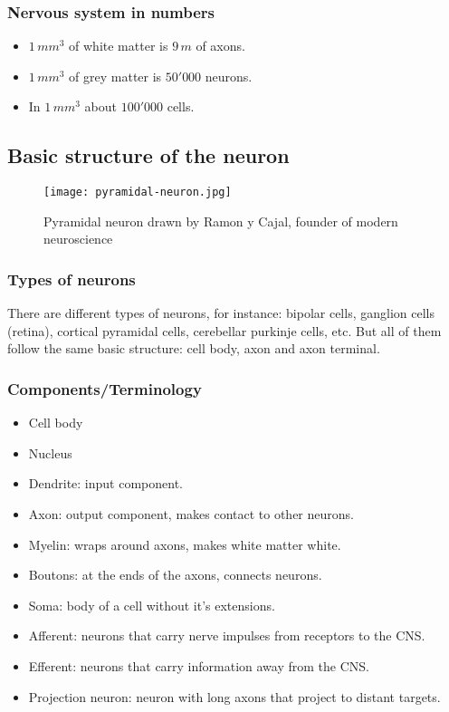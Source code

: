\documentclass[main]{subfiles}
\begin{document}
\subsubsection{Nervous system in numbers}
\begin{itemize}[noitemsep,nolistsep]
	\item $1\,mm^3$ of white matter is $9\,m$ of axons.
	\item $1\,mm^3$ of grey matter is $50'000$ neurons.
	\item In $1\,mm^3$ about $100'000$ cells.
\end{itemize}

\subsection{Basic structure of the neuron}

\begin{figure}[H]
	\centering
	\texttt{[image: pyramidal-neuron.jpg]}
	\caption{Pyramidal neuron drawn by Ramon y Cajal, founder of modern neuroscience}
\end{figure}

\subsubsection{Types of neurons}
There are different types of neurons, for instance: bipolar cells, ganglion cells (retina), cortical pyramidal cells, cerebellar purkinje cells, etc. But all of them follow the same basic structure: cell body, axon and axon terminal.

\subsubsection{Components/Terminology}
\begin{itemize}[noitemsep,nolistsep]
	\item Cell body
	\item Nucleus
	\item Dendrite: input component.
	\item Axon: output component, makes contact to other neurons.
	\item Myelin: wraps around axons, makes white matter white.
	\item Boutons: at the ends of the axons, connects neurons.
	\item Soma: body of a cell without it's extensions.
	\item Afferent: neurons that carry nerve impulses from receptors to the CNS.
	\item Efferent: neurons that carry information away from the CNS.
	\item Projection neuron: neuron with long axons that project to distant targets.
\end{itemize}
\end{document}
